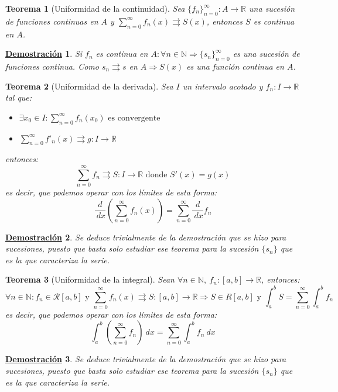 \documentclass[10pt,a4paper,openright]{book}
\theoremstyle{break}
\newtheorem{theo}{Teorema}[chapter]
\newtheorem*{demo}{\underline{Demostración}}
\newcommand{\dif}[1]{\ d#1}
\begin{document}
\begin{theo}[Uniformidad de la continuidad]
Sea $\{f_n\}_{n = 0}^\infty : A \rightarrow \mathbb{R}$ una sucesión de funciones continuas en $A$ y $\sum_{n=0}^{\infty} f_n (x) \rightrightarrows S(x)$, entonces $S$ es continua en $A$.
\end{theo}
\begin{demo}
Si $f_n$ es continua en $A : \forall n \in \mathbb N\Rightarrow \{s_n\}_{n = 0}^\infty$ es una sucesión de funciones continua. Como $s_n \rightrightarrows s$ en $A \Rightarrow S(x)$ es una función continua en $A$.
\end{demo}

\begin{theo}[Uniformidad de la derivada]
Sea $I$ un intervalo acotado y $f_n : I \to \mathbb{R}$ tal que:
\begin{itemize}
\item $\exists x_0 \in I :  \displaystyle\sum_{n = 0}^{\infty} f_n (x_0) \mbox{ es convergente }$
\item $\displaystyle \sum_{n = 0}^{\infty} f'_n (x) \rightrightarrows g:I \to \mathbb{R}$
\end{itemize}
entonces:
$$\sum_{n = 0}^{\infty} f_n \rightrightarrows S: I \to \mathbb{R} \mbox{  donde } S'(x) = g(x)$$
es decir, que podemos operar con los límites de esta forma:
$$\frac{d}{\dif{x}}\left( \sum_{n = 0}^{\infty} f_n (x) \right) = \sum_{n = 0}^{\infty} \frac{d}{\dif{x}} f_n$$
\end{theo}
\begin{demo}
Se deduce trivialmente de la demostración que se hizo para sucesiones, puesto que basta solo estudiar ese teorema para la sucesión $\{s_n\}$ que es la que caracteriza la serie.
\end{demo}

\begin{theo}[Uniformidad de la integral]
Sean $\forall n \in \mathbb{N}, \ f_n: [a,b]\rightarrow \mathbb{R}$, entonces:
$$\forall n \in \mathbb N: f_n \in \mathcal{R}[a,b] \mbox{ y } \sum_{n = 0}^{\infty} f_n (x)\rightrightarrows S:[a,b] \to \mathbb{R} \Rightarrow S\in R[a,b] \mbox{ y } \int_{a}^{b} S = \sum_{n=0}^{\infty} \int_{a}^{b} f_n$$
es decir, que podemos operar con los límites de esta forma:
$$
\int_{a}^{b} \left(\sum_{n = 0}^{\infty} f_n \right) \dif{x}= \sum_{n=0}^{\infty} \int_{a}^{b} f_n \dif{x}$$
\end{theo}
\begin{demo}
Se deduce trivialmente de la demostración que se hizo para sucesiones, puesto que basta solo estudiar ese teorema para la sucesión $\{s_n\}$ que es la que caracteriza la serie.
\end{demo}
\end{document}
